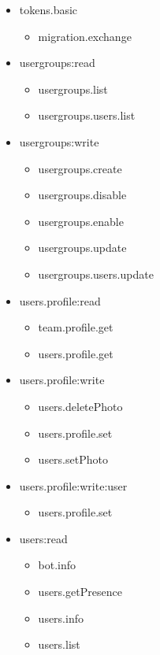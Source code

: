 \begin{multicols}{2}
\begin{itemize}
	\item tokens.basic
	\begin{itemize}
		\item migration.exchange
	\end{itemize}
	
	\item usergroups:read
	\begin{itemize}
		\item usergroups.list
		\item usergroups.users.list
	\end{itemize}
	
	\item usergroups:write
	\begin{itemize}
		\item usergroups.create
		\item usergroups.disable
		\item usergroups.enable
		\item usergroups.update
		\item usergroups.users.update
	\end{itemize}
	
	\item users.profile:read
	\begin{itemize}
		\item team.profile.get
		\item users.profile.get
	\end{itemize}
	
	\item users.profile:write
	\begin{itemize}
		\item users.deletePhoto
		\item users.profile.set
		\item users.setPhoto
	\end{itemize}
	
	\item users.profile:write:user
	\begin{itemize}
		\item users.profile.set
	\end{itemize}
	
	\item users:read
	\begin{itemize}
		\item bot.info
		\item users.getPresence
		\item users.info
		\item users.list
	\end{itemize}
	

\end{itemize}
\end{multicols}
